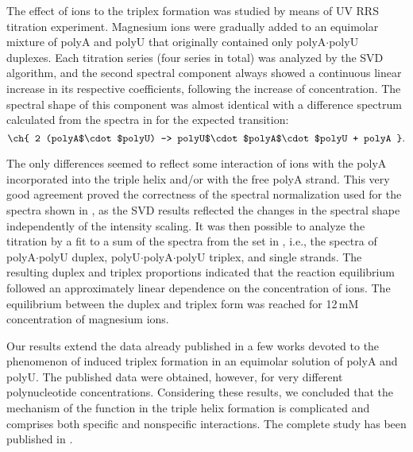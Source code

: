 The effect of  ions to the triplex formation was studied by means of
UV RRS titration experiment.
Magnesium ions were gradually added to an equimolar mixture of polyA and polyU
that originally contained only polyA$\cdot$polyU duplexes.
Each titration series (four series in total) was analyzed by the SVD algorithm,
and the second spectral component always showed a continuous linear increase in
its respective coefficients, following the increase of 
concentration.
The spectral shape of this component was almost identical with a difference
spectrum calculated from the spectra in
for the expected transition:
\begin{equation*}
	\ch{
		2 (polyA$\cdot$polyU) -> polyU$\cdot$polyA$\cdot$polyU + polyA
	}.
\end{equation*}

The only differences seemed to reflect some interaction of  ions
with the polyA incorporated into the triple helix and/or with the free polyA
strand.
This very good agreement proved the correctness of the spectral normalization
used for the spectra shown in
,
as the SVD results reflected the changes in the spectral shape independently of
the intensity scaling.
It was then possible to analyze the  titration by a fit to a sum of
the spectra from the set in
,
i.e., the spectra of polyA$\cdot$polyU duplex, polyU$\cdot$polyA$\cdot$polyU
triplex, and single strands.
The resulting duplex and triplex proportions indicated that the reaction
equilibrium followed an approximately linear dependence on the concentration of
 ions.
The equilibrium between the duplex and triplex form was reached for 12\,mM
concentration of magnesium ions.

Our results extend the data already published in a few works devoted to the
phenomenon of  induced triplex formation in an equimolar solution
of polyA and polyU.
The published data were obtained, however, for very different polynucleotide
concentrations.
Considering these results, we concluded that the mechanism of the 
function in the triple helix formation is complicated and comprises both
specific and nonspecific interactions.
The complete study has been published in \textcite{Klener2015}.
